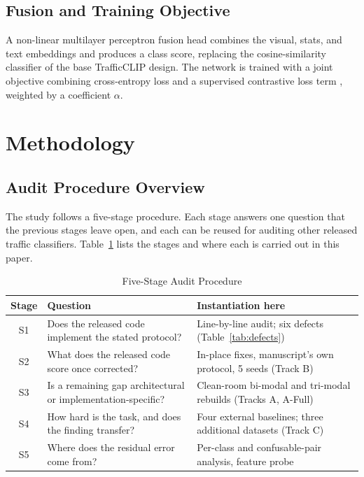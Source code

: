 \documentclass[journal]{IEEEtran}
\begin{document}
\subsection{Fusion and Training Objective}
A non-linear multilayer perceptron fusion head combines the visual, stats, and text embeddings and produces a class score, replacing the cosine-similarity classifier of the base TrafficCLIP design. The network is trained with a joint objective combining cross-entropy loss and a supervised contrastive loss term \cite{supcon}, weighted by a coefficient $\alpha$.

\section{Methodology}\label{sec:method}

\subsection{Audit Procedure Overview}\label{sec:framework}
The study follows a five-stage procedure. Each stage answers one question that the previous stages leave open, and each can be reused for auditing other released traffic classifiers. Table~\ref{tab:framework} lists the stages and where each is carried out in this paper.

\begin{table}[t]
\caption{Five-Stage Audit Procedure}
\label{tab:framework}
\centering
\renewcommand{\arraystretch}{1.2}
\begin{tabular}{|c|p{3.0cm}|p{3.6cm}|}
\hline
\textbf{Stage} & \textbf{Question} & \textbf{Instantiation here} \\
\hline
S1 & Does the released code implement the stated protocol? & Line-by-line audit; six defects (Table~\ref{tab:defects}) \\
\hline
S2 & What does the released code score once corrected? & In-place fixes, manuscript's own protocol, 5 seeds (Track B) \\
\hline
S3 & Is a remaining gap architectural or implementation-specific? & Clean-room bi-modal and tri-modal rebuilds (Tracks A, A-Full) \\
\hline
S4 & How hard is the task, and does the finding transfer? & Four external baselines; three additional datasets (Track C) \\
\hline
S5 & Where does the residual error come from? & Per-class and confusable-pair analysis, feature probe \\
\hline
\end{tabular}
\end{table}
\end{document}
